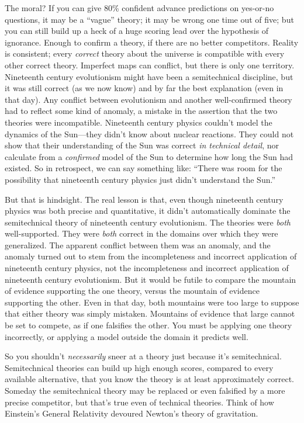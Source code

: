 {
 The moral? If you can give 80\% confident advance predictions on
yes-or-no questions, it may be a
``vague'' theory; it may be wrong
one time out of five; but you can still build up a heck of a huge
scoring lead over the hypothesis of ignorance. Enough to confirm a
theory, if there are no better competitors. Reality is consistent;
every \textit{correct} theory about the universe is compatible with
every other correct theory. Imperfect maps can conflict, but there is
only one territory. Nineteenth century evolutionism might have been a
semitechnical discipline, but it was still correct (as we now know) and
by far the best explanation (even in that day). Any conflict between
evolutionism and another well-confirmed theory had to reflect some kind
of anomaly, a mistake in the assertion that the two theories were
incompatible. Nineteenth century physics couldn't model
the dynamics of the Sun---they didn't know about
nuclear reactions. They could not show that their understanding of the
Sun was correct \textit{in technical detail}, nor calculate from a
\textit{confirmed} model of the Sun to determine how long the Sun had
existed. So in retrospect, we can say something like:
``There was room for the possibility that nineteenth
century physics just didn't understand the
Sun.''}

{
 But that is hindsight. The real lesson is that, even though
nineteenth century physics was both precise and quantitative, it
didn't automatically dominate the semitechnical theory
of nineteenth century evolutionism. The theories were \textit{both}
well-supported. They were \textit{both} correct in the domains over
which they were generalized. The apparent conflict between them was an
anomaly, and the anomaly turned out to stem from the incompleteness and
incorrect application of nineteenth century physics, not the
incompleteness and incorrect application of nineteenth century
evolutionism. But it would be futile to compare the mountain of
evidence supporting the one theory, versus the mountain of evidence
supporting the other. Even in that day, both mountains were too large
to suppose that either theory was simply mistaken. Mountains of
evidence that large cannot be set to compete, as if one falsifies the
other. You must be applying one theory incorrectly, or applying a model
outside the domain it predicts well.}

{
 So you shouldn't \textit{necessarily} sneer at a
theory just because it's semitechnical. Semitechnical
theories can build up high enough scores, compared to every available
alternative, that you know the theory is at least approximately
correct. Someday the semitechnical theory may be replaced or even
falsified by a more precise competitor, but that's true
even of technical theories. Think of how Einstein's
General Relativity devoured Newton's theory of
gravitation.}


